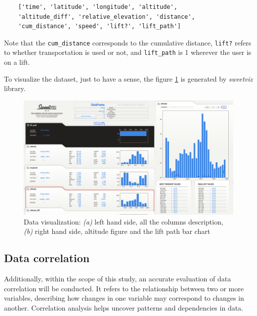 \begin{verbatim}
    ['time', 'latitude', 'longitude', 'altitude',
    'altitude_diff', 'relative_elevation', 'distance',
    'cum_distance', 'speed', 'lift?', 'lift_path']
\end{verbatim}

Note that the \texttt{cum\_distance} corresponds to the cumulative distance, 
\texttt{lift?} refers to whether transportation is used or not, and 
\texttt{lift\_path} is 1 wherever the user is on a lift.

To visualize the dataset, just to have a sense, the figure \ref*{fig:data-report} is generated by \textit{sweetviz} library. 


\begin{figure}[htb]
	\includegraphics[width=\textwidth]{resources/data-report.png}
	\caption{Data visualization: \textit{(a)} left hand side, all the columns description, \textit{(b)} right hand side, altitude figure and the lift path bar chart}
	\label{fig:data-report}
\end{figure}

\subsection{Data correlation}
Additionally, within the scope of this study, an accurate evaluation of data correlation will be conducted. It refers to the relationship between two or more variables, describing how changes in one variable may correspond to changes in another. Correlation analysis helps uncover patterns and dependencies in data.



